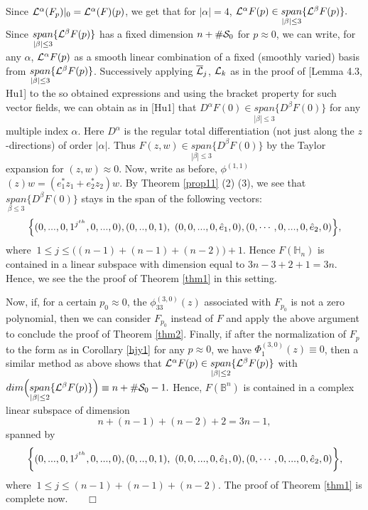 \documentclass[12pt]{article}
\numberwithin{equation}{section}
\def\a{\alpha}
\def\BB{{\mathbb B}}
\def\HH{{\mathbb H}}
\def\a{\alpha}
\def\a{\alpha}
\def\a{\alpha}
\def\a{\alpha}
\begin{document}
Since ${\cal L}^\a(F_p)|_0={\cal L}^\a(F)(p)$, we get  that for
$|\a|=4$,  $ {\cal L}^\alpha F(p) \in \underset{|\beta|\le 3}{span}
\{ {\cal L}^\beta F(p)\}.$ Since $\underset{|\beta|\le 3}{span} \{
{\cal L}^\beta F(p)\} $ has a fixed dimension $n+\# {\cal S}_0$ for
$p\approx 0$, we can write, for any $\a$, ${\cal L}^\alpha F(p)$ as
a smooth linear combination of a fixed (smoothly varied) basis from
$\underset{|\beta|\le 3}{span} \{ {\cal L}^\beta F(p)\} $.
Successively applying $\overline{\cal L}_j$, ${\cal L}_k$ as in the
proof of [Lemma 4.3, Hu1] to the so obtained expressions and using
the bracket property for such vector fields, we can obtain as in
[Hu1] that $D^\alpha F(0) \in \underset{|\beta|\le 3}{span}\{D^\beta
F(0)\}$ for any multiple index $\alpha$. Here $D^\alpha$ is the
regular total differentiation (not just along the $z$-directions) of
order $|\alpha|$. Thus $F(z,w) \in \underset{|\beta|\le
3}{span}\{D^\beta F(0)\}$ by the Taylor expansion for $(z,w)\approx
0$. Now,
write as before, {$\phi^{(1,1)}$}$(z)w=({e}^*_1 z_1 + {e}^*_{2}
z_{2})w.$ By Theorem \ref{prop11} (2) (3), we see that $
\underset{\beta\le 3}{span}\{D^\beta F(0)\}$ stays in the span of
the following vectors: $$\Big\{(0, ...,0, 1^{j^{th}},  0, ...,0),
(0, .., 0, 1),\ (0, 0, ...,0, \hat{e}_1,0),\\
(0,\cdots, 0, ...,0,\hat{e}_{2},0)\Big\},$$ where $\ 1\le j\le
\big((n-1)+(n-1)+(n-2)\big)+1$. Hence $F(\HH_n)$ is contained in a
linear subspace with dimension equal to $3n-3+2+1=3n$.
Hence, we see the  the proof of Theorem \ref{thm1} in this setting.

Now, if, for a certain $p_0\approx 0$, the $\phi^{(3,0)}_{33}(z)$
associated with $F_{p_0}$ is  not a zero polynomial, then we can
consider $F_{p_0}$ instead of $F$ and apply the above argument to
conclude the proof of Theorem \ref{thm2}. Finally, if after the
normalization of  $F_p$ to the form as in Corollary \ref{hjy1} for
any $p\approx 0$, we have $\Phi_1^{(3,0)}(z)\equiv 0$, then a
similar method as above shows that $ {\cal L}^\alpha F(p) \in
\underset{|\beta|\le 2}{span} \{ {\cal L}^\beta F(p)\}$ with
$dim\Big(\underset{|\beta|\le 2}{span} \{ {\cal L}^\beta
F(p)\}\Big)\equiv n+\#{\cal S}_0-1.$ Hence, $F({\BB}^n)$ is
contained in a complex linear subspace of dimension
$$n+(n-1)+(n-2)+2=3n-1,$$ spanned by
 $$\bigg\{(0, ...,0, 1^{j^{th}},  0, ...,0),
(0, .., 0, 1),\ (0, 0, ...,0, \hat{e}_1,0),\\
(0,\cdots, 0, ...,0,\hat{e}_{2},0)\bigg\},$$ where $\ 1\le j\le
(n-1)+(n-1)+(n-2)$. The proof of Theorem \ref{thm1} is complete now.
 \ \ \ $\Box$
\end{document}
